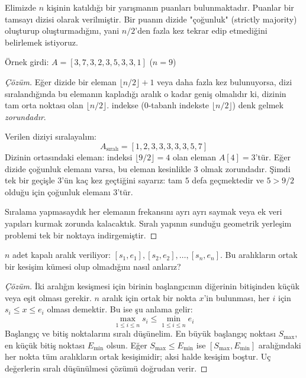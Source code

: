 \begin{example}
Elimizde $n$ kişinin katıldığı bir yarışmanın puanları bulunmaktadır. Puanlar bir tamsayı dizisi olarak verilmiştir. Bir puanın dizide "çoğunluk" (strictly majority) oluşturup oluşturmadığını, yani $n/2$'den fazla kez tekrar edip etmediğini belirlemek istiyoruz.

Örnek girdi: $A = [3, 7, 3, 2, 3, 5, 3, 3, 1]$ ($n = 9$)
\end{example}

\begin{proof}[Çözüm]
Eğer dizide bir eleman $\lfloor n/2 \rfloor + 1$ veya daha fazla kez bulunuyorsa, dizi sıralandığında bu elemanın kapladığı aralık o kadar geniş olmalıdır ki, dizinin tam orta noktası olan $\lfloor n/2 \rfloor$. indekse (0-tabanlı indekste $\lfloor n/2 \rfloor$) denk gelmek \emph{zorundadır}.

Verilen diziyi sıralayalım:
\[
A_{\text{sıralı}} = [1, 2, 3, 3, 3, 3, 3, 5, 7]
\]
Dizinin ortasındaki eleman: indeksi $\lfloor 9/2 \rfloor = 4$ olan eleman $A[4] = 3$'tür.
Eğer dizide çoğunluk elemanı varsa, bu eleman kesinlikle $3$ olmak zorundadır. Şimdi tek bir geçişle $3$'ün kaç kez geçtiğini sayarız: tam $5$ defa geçmektedir ve $5 > 9/2$ olduğu için çoğunluk elemanı $3$'tür.

Sıralama yapmasaydık her elemanın frekansını ayrı ayrı saymak veya ek veri yapıları kurmak zorunda kalacaktık. Sıralı yapının sunduğu geometrik yerleşim problemi tek bir noktaya indirgemiştir.
\end{proof}

\begin{example}
$n$ adet kapalı aralık veriliyor: $[s_1, e_1], [s_2, e_2], \dots, [s_n, e_n]$. Bu aralıkların ortak bir kesişim kümesi olup olmadığını nasıl anlarız?
\end{example}

\begin{proof}[Çözüm]
İki aralığın kesişmesi için birinin başlangıcının diğerinin bitişinden küçük veya eşit olması gerekir. $n$ aralık için ortak bir nokta $x$'in bulunması, her $i$ için $s_i \le x \le e_i$ olması demektir. Bu ise şu anlama gelir:
\[
\max_{1 \le i \le n} s_i \le \min_{1 \le i \le n} e_i
\]
Başlangıç ve bitiş noktalarını sıralı düşünelim. En büyük başlangıç noktası $S_{\max}$, en küçük bitiş noktası $E_{\min}$ olsun. Eğer $S_{\max} \le E_{\min}$ ise $[S_{\max}, E_{\min}]$ aralığındaki her nokta tüm aralıkların ortak kesişimidir; aksi halde kesişim boştur. Uç değerlerin sıralı düşünülmesi çözümü doğrudan verir.
\end{proof}

